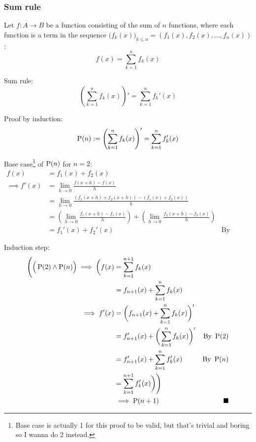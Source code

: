 \subsubsection{Sum rule}
Let \(f : A \to B\) be a function consisting of the sum of \(n\) functions, where each function is a term in the sequence \(\big(f_k(x)\big)_{k \le n} = (f_1(x), f_2(x),\dots, f_n(x))\):
\begin{equation}
    f(x) = \sum_{k=1}^{n}f_k(x)
\end{equation}

Sum rule:
\begin{equation}
    \left(\sum_{k=1}^{n}f_k(x)\right)' = \sum_{k=1}^{n}f_k'(x)
\end{equation}

Proof by induction:
\begin{equation}
    \operatorname{P}(n) := \left(\sum_{k=1}^{n}f_k(x)\right)' = \sum_{k=1}^{n}f_k'(x)
\end{equation}

Base case\footnote{Base case is actually 1 for this proof to be valid, but that's trivial and boring so I wanna do 2 instead.} of \(\operatorname{P}(n)\) for \(n=2\):
\begin{align*}
    f(x) &= f_1(x) + f_2(x) \\
    \implies f'(x) &= \lim_{h \to 0}\frac{f(x + h) - f(x)}{h} \\
    &= \lim_{h \to 0} \frac{(f_1(x + h) + f_2(x + h)) - (f_1(x) + f_2(x))}{h} \\
    &= \left(\lim_{h \to 0} \frac{f_1(x + h) - f_1(x)}{h}\right) + \left(\lim_{h \to 0} \frac{f_2(x + h) - f_2(x)}{h}\right) \\
    &= f_1'(x) + f_2'(x) & \text{By definition 1.2.5}
\end{align*}

Induction step:
\begin{align*}
    \Bigg(\Big(\operatorname{P}(2) \land \operatorname{P}(n)\Big) \implies \bigg(f(x) &= \sum_{k=1}^{n+1}f_k(x) \\
    &= f_{n+1}(x) + \sum_{k=1}^{n}f_k(x) \\
    \implies f'(x) &= \bigg(f_{n+1}(x) + \sum_{k=1}^{n}f_k(x)\bigg)' \\
    &= f_{n+1}'(x) + \bigg(\sum_{k=1}^{n}f_k(x)\bigg)' & \text{By } \operatorname{P}(2) \\
    &= f_{n+1}'(x) + \sum_{k=1}^{n}f_k'(x) & \text{By } \operatorname{P}(n) \\
    &= \sum_{k=1}^{n+1}f_k'(x)\bigg)\Bigg) \\
    &\implies \operatorname{P}(n+1) & \blacksquare
\end{align*}
